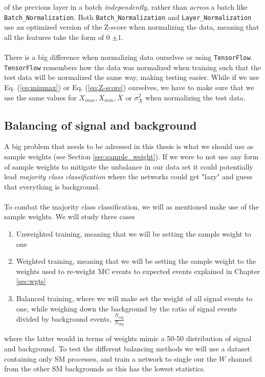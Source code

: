 \documentclass[12pt, a4paper]{book}
\begin{document}
of the previous layer in a batch \textit{independently}, rather than \textit{across} a batch like \verb|Batch_Normalization|. Both \verb|Batch_Normalization| and \verb|Layer_Normalization| use an optimized version of the Z-score when normalizing the data, meaning that all the features 
take the form of 0 $\pm1$.\\
\\There is a big difference when normalizing data ourselves or using \verb|TensorFlow|. \verb|TensorFlow| remembers how the data was normalized when training such that the test data will be normalized the same way, making testing easier. While if we use Eq. (\ref{eq:minmax}) or 
Eq. (\ref{eq:Z-score}) ourselves, we have to make sure that we use the same values for $X_{max}, X_{min}, \bar{X}$ or $\sigma_X^2$ when normalizing the test data. 



\subsection{Balancing of signal and background}\label{sec:balance_NN}
A big problem that needs to be adressed in this thesis is what we should use as sample weights (see Section \ref{sec:sample_weight}). If we were to not use any form of sample weights to mitigate the unbalance in our data set it could potentially lead \textit{majority class classification} where the 
networks could get "lazy" and guess that everything is background. \\
\\To combat the majority class classification, we will as mentioned make use of the sample weights. We will study three cases
\begin{enumerate}
   \item Unweighted training, meaning that we will be setting the sample weight to one
   \item Weighted training, meaning that we will be setting the sample weight to the weights used to re-weight MC events to expected events explained in Chapter \ref{sec:wgts}
   \item Balanced training, where we will make set the weight of all signal events to one, while weighing down the background by the ratio of signal events divided by background events, $\frac{N_{sig}}{N_{bkg}}$ 
\end{enumerate}
where the latter would in terms of weights mimic a 50-50 distribution of signal and background. To test the different balancing methods we will use a dataset containing only SM processes, and train a network to single our the $W$ channel from the other SM backgrounds as this has the lowest statistics. 
\end{document}
